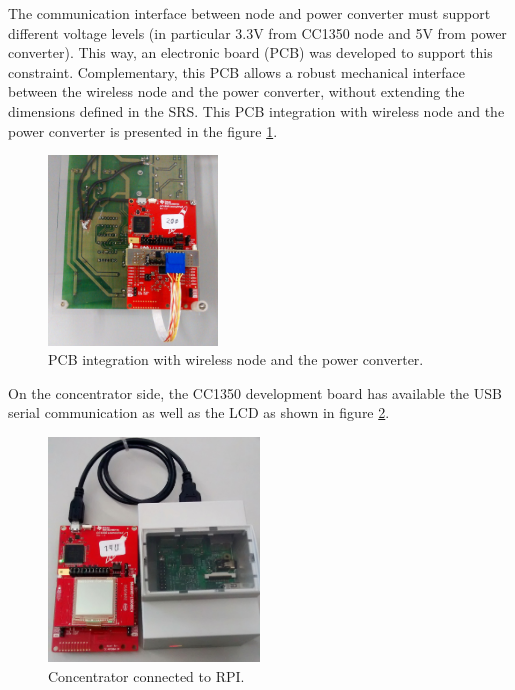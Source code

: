 The communication interface between node and power converter must support different voltage levels (in particular 3.3V from CC1350 node and 5V from power converter). This way, an electronic board (PCB) was developed to support this constraint. Complementary, this PCB allows a robust mechanical interface between the wireless node and the power converter, without extending the dimensions defined in the SRS. This PCB integration with wireless node and the power converter is presented in the figure \ref{fig:3.2.pcb}.

\begin{figure}[h!]
	\centering
	\includegraphics[width=0.4\textwidth,keepaspectratio]{figures/pcb}
	\caption{PCB integration with wireless node and the power converter.}
	\label{fig:3.2.pcb}
\end{figure}

On the concentrator side, the CC1350 development board has available the USB serial communication as well as the LCD as shown in figure \ref{fig:3.2.concentr}.

\begin{figure}[h!]
	\centering
	\includegraphics[width=0.5\textwidth,keepaspectratio]{figures/concentr}
	\caption{Concentrator connected to RPI.}
	\label{fig:3.2.concentr}
\end{figure}


